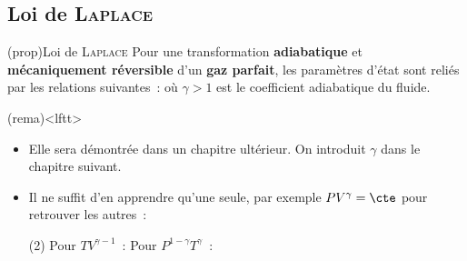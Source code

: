 \documentclass[../../main/main.tex]{subfiles}
\begin{document}
\subsection{Loi de \textsc{Laplace}}
\begin{tcb*}(prop){Loi de \textsc{Laplace}}
	Pour une transformation \textbf{adiabatique} et \textbf{mécaniquement
		réversible} d'un \textbf{gaz parfait}, les paramètres d'état sont reliés par
	les relations suivantes~:
	\psw{%
	\[
		PV^{\gamma} = \cte
		\qqet
		P^{1-\gamma}T^{\gamma} = \cte
		\qqet
		TV^{\gamma-1} = \cte
	\]
	}%
	où $\gamma > 1$ est le coefficient adiabatique du fluide.
\end{tcb*}
\begin{tcb}(rema)<lftt>{}
	\begin{itemize}
		\item Elle sera démontrée dans un chapitre ultérieur. On introduit $\gamma$ dans le
		      chapitre suivant.
		\item Il ne suffit d'en apprendre qu'une seule, par exemple $PV^{\gamma} =
			      \cte$ pour retrouver les autres~:
		      \begin{tasks}[label=\btrg](2)
			      \task Pour $TV^{\gamma-1}$~:
			      \vspace{-15pt}
			      \task Pour $P^{1-\gamma}T^{\gamma}$~:
			      \vspace{-15pt}
		      \end{tasks}
	\end{itemize}
	\vspace{-15pt}
\end{tcb}
\end{document}
